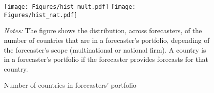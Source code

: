 \begin{figure}[h]
		\centering
		\texttt{[image: Figures/hist\_mult.pdf]}
		\texttt{[image: Figures/hist\_nat.pdf]}	
	\caption{Number of countries in forecasters' portfolio}
	\label{fig:hist}
	\begin{fignote}
		\textit{Notes:} The figure shows the distribution, across forecasters, of the number of countries that are in a forecaster's portfolio, depending of the forecaster's scope (multinational or national firm). A country is in a forecaster's portfolio if the forecaster provides forecasts for that country.
	\end{fignote}
\end{figure}